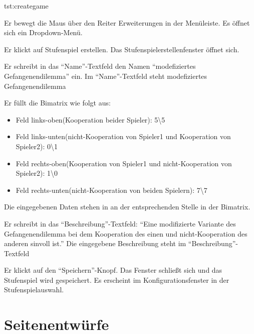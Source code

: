 \documentclass[parskip=full,11pt]{scrartcl}
\begin{document}
{tst:creategame}

{Er bewegt die Maus über den Reiter Erweiterungen in der Menüleiste.}
{Es öffnet sich ein Dropdown-Menü.}

{Er klickt auf Stufenspiel erstellen.}
{Das Stufenspielerstellenfenster öffnet sich.}

{Er schreibt in das \enquote{Name}-Textfeld den Namen \enquote{modefiziertes Gefangenendilemma} ein.}
{Im \enquote{Name}-Textfeld steht modefiziertes Gefangenendilemma}

{Er füllt die Bimatrix wie folgt aus:
\begin{itemize}
\item Feld links-oben(Kooperation beider Spieler): 5\textbackslash 5
\item Feld links-unten(nicht-Kooperation von Spieler1 und Kooperation von Spieler2): 0\textbackslash 1
\item Feld rechts-oben(Kooperation von Spieler1 und nicht-Kooperation von Spieler2): 1\textbackslash 0
\item Feld rechts-unten(nicht-Kooperation von beiden Spielern): 7\textbackslash 7
\end{itemize}}
{Die eingegebenen Daten stehen in an der entsprechenden Stelle in der Bimatrix.}

{Er schreibt in das \enquote{Beschreibung}-Textfeld: \enquote{Eine modifizierte Variante des Gefangenendilemma bei dem Kooperation des einen und nicht-Kooperation des anderen sinvoll ist.}}
{Die eingegebene Beschreibung steht im \enquote{Beschreibung}-Textfeld}

{Er klickt auf den \enquote{Speichern}-Knopf.}
{Das Fenster schließt sich und das Stufenspiel wird gespeichert. Es erscheint im Konfigurationsfenster in der Stufenspielauswahl.}

\appendix
\newpage
\section{Seitenentwürfe}
\end{document}
